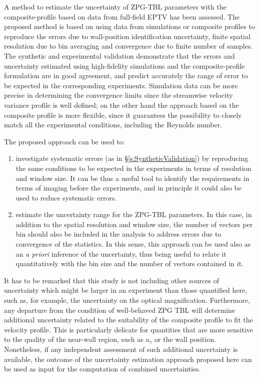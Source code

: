 A method to estimate the uncertainty of {ZPG-}TBL parameters with the composite-profile based on data from full-field EPTV has been assessed. The proposed method is based on using data from simulations or composite profiles to reproduce the errors due to {wall-position} identification uncertainty, finite spatial resolution due to bin averaging and convergence due to finite number of samples. The synthetic and experimental validation demonstrate that the errors and uncertainty estimated using high-fidelity simulations and the composite-profile formulation are in good agreement, and predict accurately the range of error to be expected in the corresponding experiments. Simulation data can be more precise in determining the convergence limits since the streamwise velocity variance profile is well defined; on the other hand the approach based on the composite profile is more flexible, since it guarantees the possibility to closely match all the experimental conditions, including the Reynolds number.

The proposed approach can be used to:
\begin{enumerate}
    \item investigate systematic errors (as in \S\ref{s:SyntheticValidation}) by reproducing the same conditions to be expected in the experiments in terms of resolution and window size. It can be thus a useful tool to identify the requirements in terms of imaging before the experiments, and in principle it could also be used to reduce systematic errors.
    \item estimate the uncertainty range for the ZPG-TBL parameters. In this case, in addition to the spatial resolution and window size, the number of vectors per bin should also be included in the analysis to address errors due to convergence of the statistics. In this sense, this approach can be used also as an \textit{a priori} inference of the uncertainty, thus being useful to relate it quantitatively with the bin size and the number of vectors contained in it.
\end{enumerate}

\noindent{}It has to be remarked that this study is not including other sources of uncertainty which might be larger in an experiment than those quantified here, such as, for example, the uncertainty on the optical magnification. Furthermore, any departure from the condition of well-behaved ZPG TBL will determine additional uncertainty related to the suitability of the composite profile to fit the velocity profile. This is particularly delicate for quantities that are more sensitive to the quality of the near-wall region, such as $u_\tau$ or the wall position. 
Nonetheless, if any independent assessment of such additional uncertainty is available, the outcome of the uncertainty estimation approach proposed here can be used as input for the computation of combined uncertainties. \\

